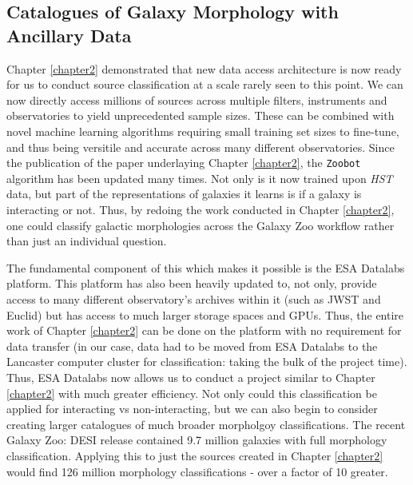 \subsection{Catalogues of Galaxy Morphology with Ancillary Data}
\noindent Chapter \ref{chapter2} demonstrated that new data access architecture is now ready for us to conduct source classification at a scale rarely seen to this point. We can now directly access millions of sources across multiple filters, instruments and observatories to yield unprecedented sample sizes. These can be combined with novel machine learning algorithms requiring small training set sizes to fine-tune, and thus being versitile and accurate across many different observatories. Since the publication of the paper underlaying Chapter \ref{chapter2}, the \texttt{Zoobot} algorithm has been updated many times. Not only is it now trained upon \textit{HST} data, but part of the representations of galaxies it learns is if a galaxy is interacting or not. Thus, by redoing the work conducted in Chapter \ref{chapter2}, one could classify galactic morphologies across the Galaxy Zoo workflow rather than just an individual question.

The fundamental component of this which makes it possible is the ESA Datalabs platform. This platform has also been heavily updated to, not only, provide access to many different observatory's archives within it (such as JWST and Euclid) but has access to much larger storage spaces and GPUs. Thus, the entire work of Chapter \ref{chapter2} can be done on the platform with no requirement for data transfer (in our case, data had to be moved from ESA Datalabs to the Lancaster computer cluster for classification: taking the bulk of the project time). Thus, ESA Datalabs now allows us to conduct a project similar to Chapter \ref{chapter2} with much greater efficiency. Not only could this classification be applied for interacting vs non-interacting, but we can also begin to consider creating larger catalogues of much broader morpholgoy classifications. The recent Galaxy Zoo: DESI release contained 9.7 million galaxies with full morphology classification. Applying this to just the sources created in Chapter \ref{chapter2} would find 126 million morphology classifications - over a factor of 10 greater.


